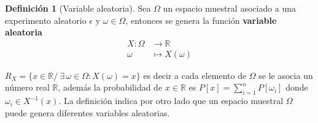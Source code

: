 \documentclass[10pt,]{krantz}
\theoremstyle{definition}
\newtheorem{definition}{Definición}[chapter]
\theoremstyle{definition}
\theoremstyle{definition}
\theoremstyle{definition}
\theoremstyle{remark}
\begin{document}
\begin{definition}[Variable aleatoria]
\protect\hypertarget{def:unnamed-chunk-16}{}{\label{def:unnamed-chunk-16} {} }Sea \(\Omega\) un espacio muestral asociado a una experimento aleatorio \(\epsilon\) y \(\omega\in\Omega\), entonces se genera la función \textbf{variable aleatoria}
\begin{align*}
  X:\Omega&\longrightarrow \mathbb{R}\\
  \omega&\longmapsto X(\omega)
\end{align*}
\end{definition}
\(R_{X}=\{x\in \mathbb {R} /\ \exists \,\omega \in \Omega :X(\omega )=x\}\)
es decir a cada elemento de \(\Omega\) se le asocia un número real \(\mathbb{R}\), además la probabilidad de \(x\in \mathbb{R}\) es \(P[x]= \sum^{n}_{i=1}P\left[\omega_i\right]\) donde \(\omega_i\in X^{-1}(x)\). La definición indica por otro lado que un espacio muestral \(\Omega\) puede genera diferentes variables aleatorias.
\end{document}
